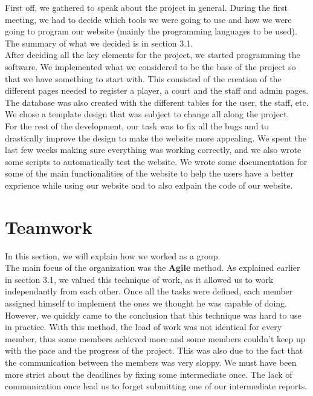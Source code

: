 \documentclass[a4paper, 12pt]{article}
\begin{document}
First off, we gathered to speak about the project in general. During the first meeting, we had to decide which tools we were going to use and how we were going to program our website (mainly the programming languages to be used). The summary of what we decided is in section 3.1.\\

After deciding all the key elements for the project, we started programming the software. We implemented what we considered to be the base of the project so that we have something to start with. This consisted of the creation of the different pages needed to register a player, a court and the staff and admin pages. The database was also created with the different tables for the user, the staff, etc. We chose a template design that was subject to change all along the project.\\

For the rest of the development, our task was to fix all the bugs and to drastically improve the design to make the website more appealing. We spent the last few weeks making sure everything was working correctly, and we also wrote some scripts to automatically test the website. We wrote some documentation for some of the main functionalities of the website to help the users have a better exprience while using our website and to also exlpain the code of our website.

\section{Teamwork}

In this section, we will explain how we worked as a group.\\

The main focus of the organization was the \textbf{Agile} method. As explained earlier in section 3.1, we valued this technique of work, as it allowed us to work independantly from each other. Once all the tasks were defined, each member assigned himself to implement the ones we thought he was capable of doing.\\

However, we quickly came to the conclusion that this technique was hard to use in practice. With this method, the load of work was not identical for every member, thus some members achieved more and some members couldn't keep up with the pace and the progress of the project. This was also due to the fact that the communication between the members was very sloppy. We must have been more strict about the deadlines by fixing some intermediate once. The lack of communication once lead us to forget submitting one of our intermediate reports.\\
\end{document}
